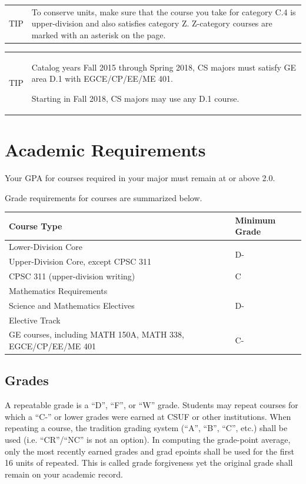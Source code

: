 \documentclass{book}
\newenvironment{tip}{
  \tcolorbox \begin{tabular}{m{.5in} m{5.25in}}
    \Large{TIP} &
}{
  \end{tabular} \endtcolorbox
}
\begin{document}
\begin{tip}
To conserve units, make sure that the course you take for category C.4 is upper-division and also satisfies category Z. Z-category courses are marked with an asterisk on the \gecourselist page.
\end{tip}


\begin{tip}
 Catalog years Fall 2015 through Spring 2018, CS majors must satisfy GE area D.1 with EGCE/CP/EE/ME 401.

 Starting in Fall 2018, CS majors may use any D.1 course.
\end{tip}

\section{Academic Requirements}

Your GPA for courses required in your major must remain at or above 2.0.

Grade requirements for courses are summarized below.

\begin{center}
\begin{tabular}{|p{3in}|l|} \hline
  \textbf{Course Type} & \textbf{Minimum Grade} \\ \hline
  Lower-Division Core & \multirow{2}{*}{D-} \\
  Upper-Division Core, except CPSC 311 & \\ \hline
  CPSC 311 (upper-division writing) & C \\ \hline
  Mathematics Requirements & \multirow{3}{*}{D-} \\
  Science and Mathematics Electives & \\
  Elective Track & \\ \hline
  GE courses, including MATH 150A, MATH 338, EGCE/CP/EE/ME 401 & \multirow{2}{*}{C-} \\ \hline
\end{tabular}
\end{center}

\subsection{Grades}
\label{subsection:grades}
A repeatable grade is a ``D'', ``F'', or ``W'' grade. Students may repeat courses for which a ``C-'' or lower grades were earned at CSUF or other institutions. When repeating a course, the tradition grading system (``A'', ``B'', ``C'', etc.) shall be used (i.e. ``CR''/``NC'' is not an option). In computing the grade-point average, only the most recently earned grades and grad epoints shall be used for the first 16 units of repeated. This is called grade forgiveness yet the original grade shall remain on your academic record.
\end{document}
